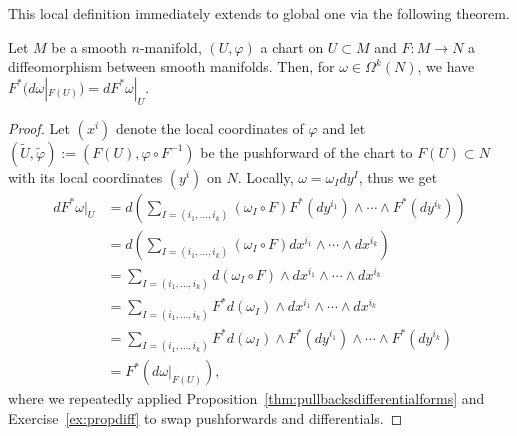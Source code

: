 This local definition immediately extends to global one via the following theorem.

\begin{theorem}\label{thm:differentialpushforward}
  Let $M$ be a smooth $n$-manifold, $(U,\varphi)$ a chart on $U\subset M$ and $F:M\to N$ a diffeomorphism between smooth manifolds.
  Then, for $\omega\in\Omega^k(N)$, we have $F^*(d\omega|_{F(U)}) = dF^*\omega|_U$.
\end{theorem}
\begin{proof}
  Let $(x^i)$ denote the local coordinates of $\varphi$ and let $(\widetilde U, \widetilde\varphi) := (F(U), \varphi\circ F^{-1})$ be the pushforward of the chart to $F(U)\subset N$ with its local coordinates $(y^i)$ on $N$.
  Locally, $\omega = \omega_I dy^I$, thus we get
  \begin{align}
    d F^* \omega|_U
    &= d\left( \sum_{I=(i_1,\ldots,i_k)}(\omega_I\circ F) F^*(dy^{i_1})\wedge\cdots\wedge F^*(dy^{i_k})\right) \\
    &= d\left( \sum_{I=(i_1,\ldots,i_k)}(\omega_I\circ F) dx^{i_1}\wedge\cdots\wedge dx^{i_k}\right) \\
    &= \sum_{I=(i_1,\ldots,i_k)} d(\omega_I\circ F)\wedge dx^{i_1}\wedge\cdots\wedge dx^{i_k} \\
    &= \sum_{I=(i_1,\ldots,i_k)} F^* d(\omega_I)\wedge dx^{i_1}\wedge\cdots\wedge dx^{i_k} \\
    &= \sum_{I=(i_1,\ldots,i_k)} F^* d(\omega_I)\wedge F^*(dy^{i_1})\wedge\cdots\wedge F^*(dy^{i_k}) \\
    &= F^*(d\omega|_{F(U)}),
  \end{align}
  where we repeatedly applied Proposition~\ref{thm:pullbacksdifferentialforms} and Exercise~\ref{ex:propdiff} to swap pushforwards and differentials.
\end{proof}

